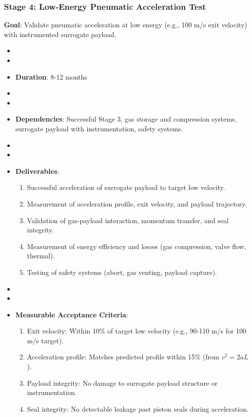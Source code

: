 \subsubsection{Stage 4: Low-Energy Pneumatic Acceleration Test}
\textbf{Goal}: Validate pneumatic acceleration at low energy (e.g., 100 m/s exit velocity) with instrumented surrogate payload.
\begin{itemize}
    \item \item \item \textbf{Duration}: 8-12 months
    \item \item \item \textbf{Dependencies}: Successful Stage 3, gas storage and compression systems, surrogate payload with instrumentation, safety systems.
    \item \item \item \textbf{Deliverables}:
        \begin{enumerate}
            \item Successful acceleration of surrogate payload to target low velocity.
            \item Measurement of acceleration profile, exit velocity, and payload trajectory.
            \item Validation of gas-payload interaction, momentum transfer, and seal integrity.
            \item Measurement of energy efficiency and losses (gas compression, valve flow, thermal).
            \item Testing of safety systems (abort, gas venting, payload capture).
        \end{enumerate}
    \item \item \item \textbf{Measurable Acceptance Criteria}:
        \begin{enumerate}
            \item Exit velocity: Within 10\% of target low velocity (e.g., 90-110 m/s for 100 m/s target).
            \item Acceleration profile: Matches predicted profile within 15\% (from $v^2 = 2aL$).
            \item Payload integrity: No damage to surrogate payload structure or instrumentation.
            \item Seal integrity: No detectable leakage past piston seals during acceleration.

\end{enumerate}
\end{itemize}
